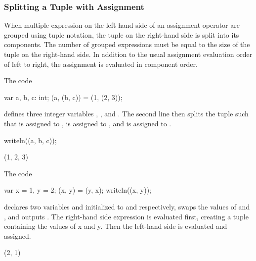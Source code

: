 \subsubsection{Splitting a Tuple with Assignment}

When multiple expression on the left-hand side of an assignment
operator are grouped using tuple notation, the tuple on the right-hand
side is split into its components.  The number of grouped expressions
must be equal to the size of the tuple on the right-hand side.  In
addition to the usual assignment evaluation order of left to right,
the assignment is evaluated in component order.

\begin{example}
\begin{chapelpre}
\end{chapelpre}
The code
\begin{chapel}
var a, b, c: int;
(a, (b, c)) = (1, (2, 3));
\end{chapel}
defines three integer variables , , and .  The
second line then splits the tuple  such that 
is assigned to ,  is assigned to ,
and  is assigned to .
\begin{chapelpost}
writeln((a, b, c));
\end{chapelpost}
\begin{chapeloutput}
(1, 2, 3)
\end{chapeloutput}
\end{example}

\begin{example}
\begin{chapelpre}
\end{chapelpre}
The code
\begin{chapel}
var x = 1, y = 2;
(x, y) = (y, x);
writeln((x, y));
\end{chapel}
declares two variables  and  initialized to 
and  respectively, swaps the values of  and ,
and outputs .  The right-hand side expression is
evaluated first, creating a tuple containing the values of x and y.
Then the left-hand side is evaluated and assigned.
\begin{chapelpost}
\end{chapelpost}
\begin{chapeloutput}
(2, 1)
\end{chapeloutput}
\end{example}


